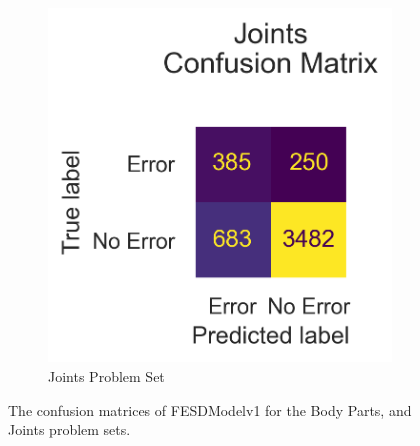 \begin{figure}[!htbp]
\begin{subfigure}[b]{0.4\linewidth}
      \includegraphics[width=\textwidth]{figures/results_hi/v1/confusion/joints_together.png}
      \caption[]{Joints Problem Set}
      \label{fig:hi_jt_conf_v1}
  \end{subfigure}
  \caption[Confusion Matrices of FESDModelv1 (200x200 pixels input resolution)]{The confusion matrices of FESDModelv1 for the Body Parts, and Joints problem sets.}
  \label{fig:hi_conf_v1}
\end{figure}

\FloatBarrier